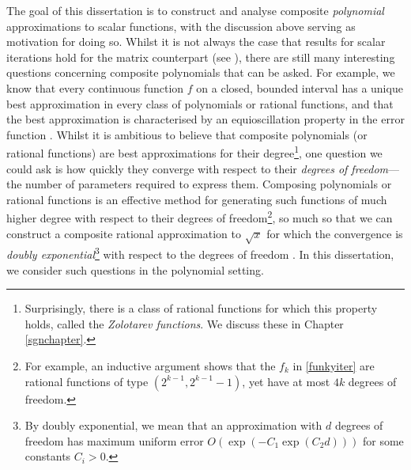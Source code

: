 \bigskip{}



The goal of this dissertation is to construct and analyse composite \textit{polynomial} approximations to scalar functions, with the discussion above serving as motivation for doing so. Whilst it is not always the case that results for scalar iterations hold for the matrix counterpart (see \cite[Section 4.9]{Higham}), there are still many interesting questions concerning composite polynomials that can be asked. For example, we know that every continuous function $f$ on a closed, bounded interval has a unique best approximation in every class of polynomials or rational functions, and that the best approximation is characterised by an equioscillation property in the error function \cite{ATAP}. Whilst it is ambitious to believe that composite polynomials (or rational functions) are best approximations for their degree\footnote{Surprisingly, there is a class of rational functions for which this property holds, called the \textit{Zolotarev functions}. We discuss these in Chapter \ref{sgnchapter}.}, one question we could ask is how quickly they converge with respect to their \textit{degrees of freedom}---the number of parameters required to express them. Composing polynomials or rational functions is an effective method for generating such functions of much higher degree with respect to their degrees of freedom\footnote{For example, an inductive argument shows that the $f_k$ in \eqref{funkyiter} are rational functions of type $(2^{k-1},2^{k-1}-1)$, yet have at most $4k$ degrees of freedom.}, so much so that we can construct a composite rational approximation to $\sqrt{x}$ for which the convergence is \textit{doubly exponential}\footnote{By doubly exponential, we mean that an approximation with $d$ degrees of freedom has maximum uniform error $O(\exp(-C_1\exp(C_2d)))$ for some constants $C_i>0$.} with respect to the degrees of freedom \cite{Yuji}. In this dissertation, we consider such questions in the polynomial setting.
